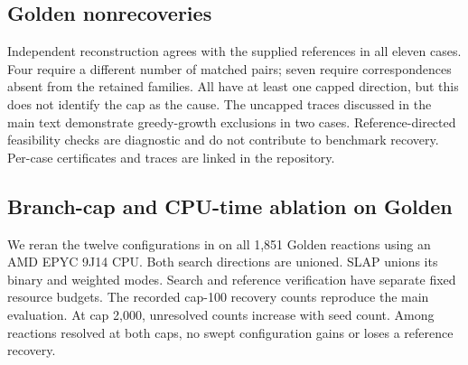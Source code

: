 \subsection{Golden nonrecoveries}

\begin{table}[ht]
\centering\small
\caption{\textbf{The eleven Golden nonrecoveries.} Case indices are zero-based. Retained pair counts cover every terminal in both directions and every saved cut at ten seed orderings and cap 100. The four cardinality mismatches concern exact reference relations, including unmatched atoms.}
\label{tab:golden-misses}

\end{table}

Independent reconstruction agrees with the supplied references in all eleven cases. Four require a different number of matched pairs; seven require correspondences absent from the retained families. All have at least one capped direction, but this does not identify the cap as the cause. The uncapped traces discussed in the main text demonstrate greedy-growth exclusions in two cases. Reference-directed feasibility checks are diagnostic and do not contribute to benchmark recovery. Per-case certificates and traces are linked in the repository.

\subsection{Branch-cap and CPU-time ablation on Golden}
\label{sec:cap-ablation}

We reran the twelve configurations in  on all 1,851 Golden reactions using an AMD EPYC 9J14 CPU. Both search directions are unioned. SLAP unions its binary and weighted modes. Search and reference verification have separate fixed resource budgets. The recorded cap-100 recovery counts reproduce the main evaluation. At cap 2,000, unresolved counts increase with seed count. Among reactions resolved at both caps, no swept configuration gains or loses a reference recovery.

\begin{table}[htbp]
\centering\footnotesize
\caption{\textbf{Golden branch-cap ablation with paired SLAP baselines.} Recovery counts confirmed reference inclusion over all 1,851 records; unknown cases remain in the denominator. CPU values are seconds per reaction. Paired CPU uses the same 1,403 reactions whose searches finish under every configuration. Spent CPU averages recorded search cost over all 1,851 selected attempts, including interrupted calls; it is not completed-search latency. Both timings exclude reference verification and initial imports. Superseded attempts are excluded. Cap 100 with a one-seed sweep is the default.}
\label{tab:golden-caps}

\end{table}

